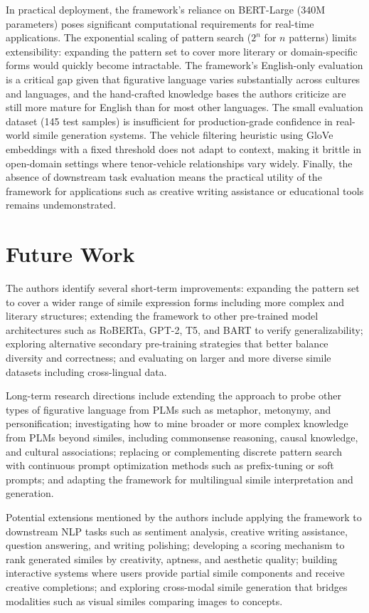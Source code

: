 \documentclass[12pt]{article}
\begin{document}
In practical deployment, the framework's reliance on BERT-Large (340M parameters) poses significant computational requirements for real-time applications. The exponential scaling of pattern search ($2^n$ for $n$ patterns) limits extensibility: expanding the pattern set to cover more literary or domain-specific forms would quickly become intractable. The framework's English-only evaluation is a critical gap given that figurative language varies substantially across cultures and languages, and the hand-crafted knowledge bases the authors criticize are still more mature for English than for most other languages. The small evaluation dataset (145 test samples) is insufficient for production-grade confidence in real-world simile generation systems. The vehicle filtering heuristic using GloVe embeddings with a fixed threshold does not adapt to context, making it brittle in open-domain settings where tenor-vehicle relationships vary widely. Finally, the absence of downstream task evaluation means the practical utility of the framework for applications such as creative writing assistance or educational tools remains undemonstrated.

\section{Future Work}

The authors identify several short-term improvements: expanding the pattern set to cover a wider range of simile expression forms including more complex and literary structures; extending the framework to other pre-trained model architectures such as RoBERTa, GPT-2, T5, and BART to verify generalizability; exploring alternative secondary pre-training strategies that better balance diversity and correctness; and evaluating on larger and more diverse simile datasets including cross-lingual data.

Long-term research directions include extending the approach to probe other types of figurative language from PLMs such as metaphor, metonymy, and personification; investigating how to mine broader or more complex knowledge from PLMs beyond similes, including commonsense reasoning, causal knowledge, and cultural associations; replacing or complementing discrete pattern search with continuous prompt optimization methods such as prefix-tuning or soft prompts; and adapting the framework for multilingual simile interpretation and generation.

Potential extensions mentioned by the authors include applying the framework to downstream NLP tasks such as sentiment analysis, creative writing assistance, question answering, and writing polishing; developing a scoring mechanism to rank generated similes by creativity, aptness, and aesthetic quality; building interactive systems where users provide partial simile components and receive creative completions; and exploring cross-modal simile generation that bridges modalities such as visual similes comparing images to concepts.
\end{document}
